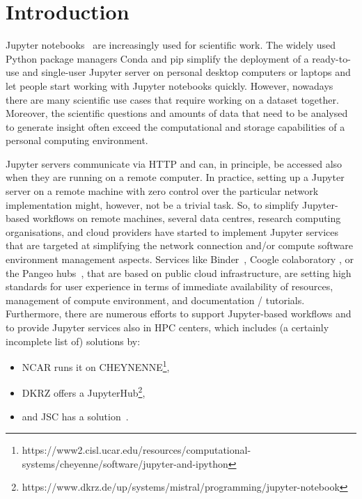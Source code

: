 
\section{Introduction}
\label{s-introductoin}

Jupyter notebooks~\citep{Kluyver2016} are increasingly used for scientific work.
The widely used Python package managers Conda and pip simplify the deployment of a ready-to-use and single-user Jupyter server on personal desktop computers or laptops and let people start working with Jupyter notebooks quickly.
However, nowadays there are many scientific use cases that require working on a dataset together.
Moreover, the scientific questions and amounts of data that need to be analysed to generate insight often exceed the computational and storage capabilities of a personal computing environment.

Jupyter servers communicate via HTTP and can, in principle, be accessed also when they are running on a remote computer.
In practice, setting up a Jupyter server on a remote machine with zero control over the particular network implementation might, however, not be a trivial task.
So, to simplify Jupyter-based workflows on remote machines, several data centres, research computing organisations, and cloud providers have started to implement Jupyter services that are targeted at simplifying the network connection and/or compute software environment management aspects.
Services like Binder~\citep{Jupyter2018}, Coogle colaboratory \citep{Google2020, Carneiro2018}, or the Pangeo hubs~\citep{robinson2019science}, that are based on public cloud infrastructure, are setting high standards for user experience in terms of immediate availability of resources, management of compute environment, and documentation / tutorials.
Furthermore, there are numerous efforts to support Jupyter-based workflows and to provide Jupyter services also in HPC centers, which includes (a certainly incomplete list of) solutions by:

\begin{itemize}
  \item NCAR runs it on CHEYNENNE\footnote{https://www2.cisl.ucar.edu/resources/computational-systems/cheyenne/software/jupyter-and-ipython},
  \item DKRZ offers a JupyterHub\footnote{https://www.dkrz.de/up/systems/mistral/programming/jupyter-notebook},
  \item and JSC has a solution~\citep{Goebbert2018}.
\end{itemize}

